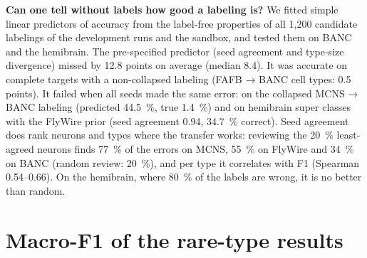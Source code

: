 \documentclass[11pt,a4paper]{article}
\begin{document}
\textbf{Can one tell without labels how good a labeling is?} We fitted simple linear predictors of accuracy from the label-free properties of all 1,200 candidate labelings of the development runs and the sandbox, and tested them on BANC and the hemibrain. The pre-specified predictor (seed agreement and type-size divergence) missed by 12.8 points on average (median 8.4). It was accurate on complete targets with a non-collapsed labeling (FAFB → BANC cell types: 0.5 points). It failed when all seeds made the same error: on the collapsed MCNS → BANC labeling (predicted 44.5~\%, true 1.4~\%) and on hemibrain super classes with the FlyWire prior (seed agreement 0.94, 34.7~\% correct). Seed agreement does rank neurons and types where the transfer works: reviewing the 20~\% least-agreed neurons finds 77~\% of the errors on MCNS, 55~\% on FlyWire and 34~\% on BANC (random review: 20~\%), and per type it correlates with F1 (Spearman 0.54–0.66). On the hemibrain, where 80~\% of the labels are wrong, it is no better than random.

\section{Macro-F1 of the rare-type results}\label{sec:S-f1}
\end{document}

